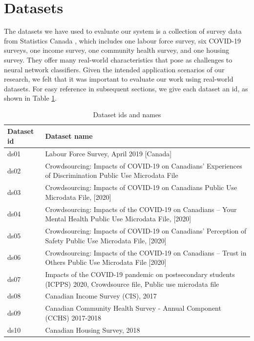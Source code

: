 \section{Datasets}
The datasets we have used to evaluate our system is a collection of survey data from Statistics Canada \cite{ds01, ds02, ds03, ds04, ds05, ds06, ds07, ds08, ds09, ds10}, which includes one labour force survey, six COVID-19 surveys, one income survey, one community health survey, and one housing survey.
They offer many real-world characteristics that pose as challenges to  neural network classifiers.  Given the intended application scenarios of our research, we felt that it was important to evaluate our work using real-world datasets. For easy reference in subsequent sections, we give each dataset an id, as shown in Table \ref{table:id_name}.   
\begin{table}[t]
	\centering
	\begin{tabularx}{\textwidth}{|l|X|}
		\hline
		\textbf{Dataset id} & \textbf{Dataset name} \\
		\hline
		ds01 & Labour Force Survey, April 2019 [Canada] \\
		ds02 & Crowdsourcing: Impacts of COVID-19 on Canadians’ Experiences of Discrimination Public Use Microdata File \\
		ds03 & Crowdsourcing: Impacts of COVID-19 on Canadians Public Use Microdata File, [2020] \\
		ds04 & Crowdsourcing: Impacts of the COVID-19 on Canadians – Your Mental Health Public Use Microdata File, [2020] \\
		ds05 & Crowdsourcing: Impacts of COVID-19 on Canadians' Perception of Safety Public Use Microdata File, [2020] \\
		ds06 & Crowdsourcing: Impacts of the COVID-19 on Canadians – Trust in Others Public Use Microdata File [2020] \\
		ds07 & Impacts of the COVID-19 pandemic on postsecondary students (ICPPS) 2020, Crowdsource file, Public use microdata file \\
		ds08 & Canadian Income Survey (CIS), 2017 \\
		ds09 & Canadian Community Health Survey - Annual Component (CCHS) 2017-2018 \\
		ds10 & Canadian Housing Survey, 2018 \\
		\hline
	\end{tabularx}
	\caption{Dataset ids and names}
	\label{table:id_name}
\end{table}

